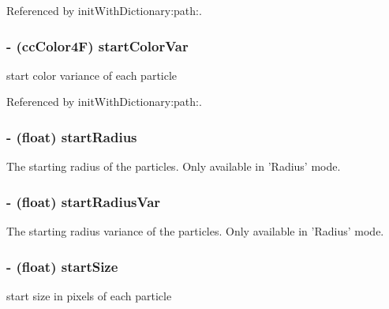 Referenced by init\-With\-Dictionary\-:path\-:.

\hypertarget{interface_c_c_particle_system_a8f0c91008053b7334dafd2c449aa85c7}{
\subsubsection[{start\-Color\-Var}]{\setlength{\rightskip}{0pt plus 5cm}-\/ ({\bf cc\-Color4\-F}) {\bf start\-Color\-Var}}}\label{interface_c_c_particle_system_a8f0c91008053b7334dafd2c449aa85c7}
start color variance of each particle 

Referenced by init\-With\-Dictionary\-:path\-:.

\hypertarget{interface_c_c_particle_system_a0b1600c0e154b7e7c9d7daec73afa50c}{
\subsubsection[{start\-Radius}]{\setlength{\rightskip}{0pt plus 5cm}-\/ (float) {\bf start\-Radius}}}\label{interface_c_c_particle_system_a0b1600c0e154b7e7c9d7daec73afa50c}
The starting radius of the particles. Only available in 'Radius' mode. \hypertarget{interface_c_c_particle_system_a2793e0e4ffa084511c56fba3364e7c97}{
\subsubsection[{start\-Radius\-Var}]{\setlength{\rightskip}{0pt plus 5cm}-\/ (float) {\bf start\-Radius\-Var}}}\label{interface_c_c_particle_system_a2793e0e4ffa084511c56fba3364e7c97}
The starting radius variance of the particles. Only available in 'Radius' mode. \hypertarget{interface_c_c_particle_system_afd9a53491a4b38a200585419f17e7095}{
\subsubsection[{start\-Size}]{\setlength{\rightskip}{0pt plus 5cm}-\/ (float) {\bf start\-Size}}}\label{interface_c_c_particle_system_afd9a53491a4b38a200585419f17e7095}
start size in pixels of each particle 

